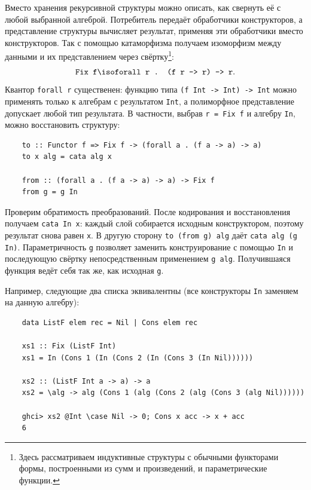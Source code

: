 Вместо хранения рекурсивной структуры можно описать, как свернуть её с любой выбранной алгеброй.
Потребитель передаёт обработчики конструкторов, а представление структуры вычисляет результат, применяя эти обработчики вместо конструкторов.
Так с помощью катаморфизма получаем изоморфизм между данными и их представлением через свёртку\footnote{Здесь рассматриваем индуктивные структуры с обычными функторами формы, построенными из сумм и произведений, и параметрические функции.}:
\[
    \texttt{Fix f} \iso \texttt{forall r . (f r -> r) -> r}.
\]
Квантор \texttt{forall r} существенен: функцию типа \texttt{(f Int -> Int) -> Int} можно применять только к алгебрам с результатом \texttt{Int}, а полиморфное представление допускает любой тип результата.
В частности, выбрав \texttt{r = Fix f} и алгебру \texttt{In}, можно восстановить структуру:
\begin{verbatim}
    to :: Functor f => Fix f -> (forall a . (f a -> a) -> a)
    to x alg = cata alg x

    from :: (forall a . (f a -> a) -> a) -> Fix f
    from g = g In
\end{verbatim}

Проверим обратимость преобразований.
После кодирования и восстановления получаем \texttt{cata In x}: каждый слой собирается исходным конструктором, поэтому результат снова равен \texttt{x}.
В другую сторону \texttt{to (from g) alg} даёт \texttt{cata alg (g In)}.
Параметричность \texttt{g} позволяет заменить конструирование с помощью \texttt{In} и последующую свёртку непосредственным применением \texttt{g alg}.
Получившаяся функция ведёт себя так же, как исходная \texttt{g}.

Например, следующие два списка эквивалентны (все конструкторы \texttt{In} заменяем на данную алгебру):
\begin{verbatim}
    data ListF elem rec = Nil | Cons elem rec

    xs1 :: Fix (ListF Int)
    xs1 = In (Cons 1 (In (Cons 2 (In (Cons 3 (In Nil))))))

    xs2 :: (ListF Int a -> a) -> a
    xs2 = \alg -> alg (Cons 1 (alg (Cons 2 (alg (Cons 3 (alg Nil))))))

    ghci> xs2 @Int \case Nil -> 0; Cons x acc -> x + acc
    6
\end{verbatim}

